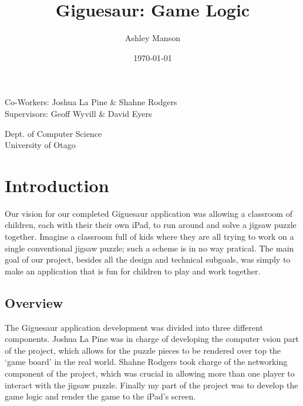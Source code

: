 \documentclass{article}
\begin{document}
\title{Giguesaur: Game Logic}
\author{Ashley Manson}
\date{\today}

\begin{titlepage}

\maketitle

\begin{center}
\large 
Co-Workers: Joshua La Pine \& Shahne Rodgers\\
Supervisors: Geoff Wyvill \& David Eyers\\

\vspace*{1\baselineskip} %

Dept. of Computer Science\\
University of Otago

\end{center}

\end{titlepage}


\tableofcontents
\newpage


\section{Introduction}

Our vision for our completed Giguesaur application was allowing a classroom of
children, each with their their own iPad, to run around and solve a jigsaw
puzzle together. Imagine a classroom full of kids where they are all trying to
work on a single conventional jigsaw puzzle; such a scheme is in no way
pratical. The main goal of our project, besides all the design and technical
subgoals, was simply to make an application that is fun for children to play and
work together.

\subsection{Overview}
The Giguesaur application development was divided into three different
components. Joshua La Pine was in charge of developing the computer vsion part
of the project, which allows for the puzzle pieces to be rendered over top the
`game board' in the real world. Shahne Rodgers took charge of the networking
component of the project, which was crucial in allowing more than one player to
interact with the jigsaw puzzle. Finally my part of the project was to develop
the game logic and render the game to the iPad's screen.
\end{document}
